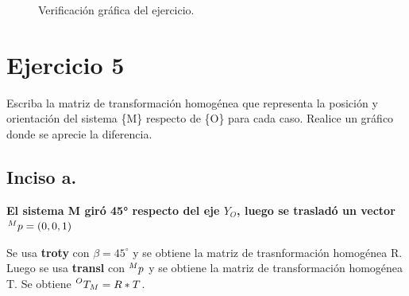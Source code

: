 \documentclass[a4paper,12pt]{article}
\begin{document}
\begin{figure}[H]
    \centering
    \begin{adjustbox}{scale = 0.85, max width=\columnwidth}
    \end{adjustbox}
    \caption{Verificación gráfica del ejercicio.}
\end{figure}

\section{Ejercicio 5}
Escriba la matriz de transformación homogénea que representa la posición y
orientación del sistema \{M\} respecto de \{O\} para cada caso. Realice un gráfico donde se
aprecie la diferencia.

\subsection{Inciso a.}
\textbf{El sistema {M} giró 45° respecto del eje $Y_O$, luego se trasladó un vector $\prescript{M}{}{p} = (0, 0, 1)$}
\vspace{0.5 cm}

Se usa \textbf{troty} con $\beta = 45^\circ$ y se obtiene la matriz de trasnformación homogénea R.
Luego se usa \textbf{transl} con $\prescript{M}{}{p}$ y se obtiene la matriz de transformación homogénea T.
Se obtiene $\prescript{O}{}{T_M} = R*T$.
\end{document}
